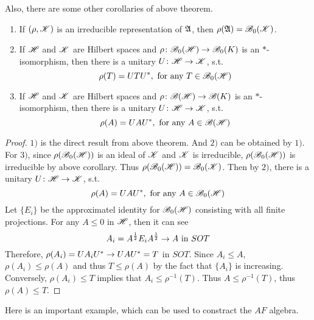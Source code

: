 Also, there are some other corollaries of above theorem.
\begin{cor} \label{cor10}
	\begin{enumerate}[label=\arabic*)]
		\item If $(\rho, \mathscr{K})$ is an irreducible representation of $\mathfrak{A}$, then $\rho(\mathfrak{A}) = \mathscr{B}_0(\mathscr{K})$.
		\item If $\mathscr{H}$ and $\mathscr{K}$ are Hilbert spaces and $\rho \colon \mathscr{B}_{0}\mathscr{(H)} \rightarrow \mathscr{B}_0(K)$ is an $*$-isomorphism, then there is a unitary $U \colon \mathscr{H} \rightarrow \mathscr{K}$, s.t.
		\begin{equation*}
			\rho(T) = U T U^{*}, \text{ for any } T \in \mathscr{B}_{0}\mathscr{(H)}
		\end{equation*}
		\item If $\mathscr{H}$ and $\mathscr{K}$ are Hilbert spaces and $\rho \colon \mathscr{B(H)} \rightarrow \mathscr{B}(K)$ is an $*$-isomorphism, then there is a unitary $U \colon \mathscr{H} \rightarrow \mathscr{K}$, s.t.
		\begin{equation*}
			\rho(A) = U A U^{*}, \text{ for any } A \in \mathscr{B(H)}
		\end{equation*}
	\end{enumerate}
\end{cor}
\begin{proof}
	$1)$ is the direct result from above theorem. And $2)$ can be obtained by $1)$. \\
	For $3)$, since $\rho(\mathscr{B}_{0}\mathscr{(H)})$ is an ideal of $\mathscr{K}$ and $\mathscr{K}$ is irreducible, $\rho(\mathscr{B}_{0}\mathscr{(H)})$ is irreducible by above corollary. Thus $\rho(\mathscr{B}_{0}\mathscr{(H)}) = \mathscr{B}_0(\mathscr{K})$. Then by $2)$, there is a unitary $U \colon \mathscr{H} \rightarrow \mathscr{K}$, s.t.
	\begin{equation*}
		\rho(A) = U A U^{*}, \text{ for any } A \in \mathscr{B}_{0}\mathscr{(H)}
	\end{equation*}
	Let $\{E_i\}$ be the approximatel identity for $\mathscr{B}_{0}\mathscr{(H)}$ consisting with all finite projections. For any $A \leqslant 0$ in $\mathscr{H}$, then it can see
	\begin{equation*}
		A_i = A^{\frac{1}{2}} E_i A^{\frac{1}{2}} \rightarrow A \text{ in } SOT
	\end{equation*}
	Therefore, $\rho(A_i) = U A_i U^{*} \rightarrow U A U^{*} = T$ in $SOT$. Since $A_i \leqslant A$, $\rho(A_i) \leqslant \rho(A)$ and thus $T \leqslant \rho(A)$ by the fact that $\{A_i\}$ is increasing. Conversely, $\rho(A_i) \leqslant T$ implies that $A_i \leqslant \rho^{-1}(T)$. Thus $A \leqslant \rho^{-1}(T)$, thus $\rho(A) \leqslant T$.
\end{proof}

Here is an important example, which can be used to constract the $AF$ algebra.

